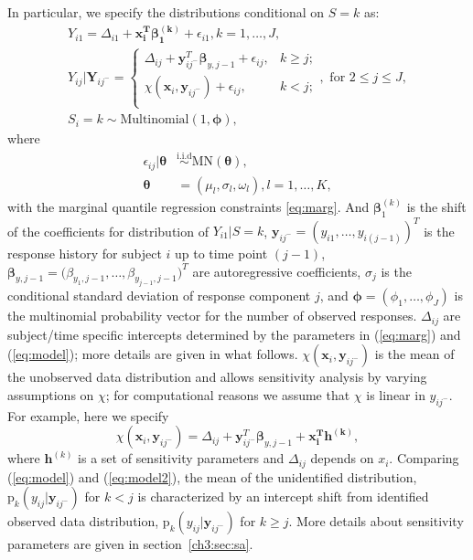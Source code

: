 \documentclass[useAMS,usenatbib,referee]{biom}
\newcommand{\iid}{\stackrel{\mbox{i.i.d}}{\sim}}
\newcommand{\pr}{\mbox{p}}
\begin{document}
In particular, we specify the distributions conditional on $S=k$ as:
\begin{equation}
  \begin{array}{l}
      \displaystyle Y_{i1} = \Delta_{i1} +  \bm{x_{i}^T\beta_1^{(k)}} + \epsilon_{i1} , k = 1, \ldots, J,\\
       \displaystyle        Y_{ij}|\bm Y_{ij^{-}} =
      \begin{cases}
        \Delta_{ij} + \bm y_{ij^{-}}^T \bm \beta_{y,j-1} + \epsilon_{ij}, & k \geq j ;  \\
        \chi(\bm x_{i}, \bm y_{ij^{-}}) + \epsilon_{ij}, & k < j ;  \\
      \end{cases}, \mbox{ for } 2 \leq j \leq J,  \\
       S_{i} = k \sim \textrm{Multinomial}(1, \bm \phi),
    \end{array}
  \label{eq:model}
\end{equation}
where
\begin{equation}
\begin{aligned}
\epsilon_{ij} |\bm \theta & \iid \mbox{MN}(\bm \theta),  \\
\bm \theta & = (\mu_l, \sigma_l, \omega_l), l = 1, \ldots, K,
\end{aligned}\label{eq:mixprob}
\end{equation}
with the marginal quantile regression constraints \eqref{eq:marg}.
And $\bm \beta_1^{(k)}$ is the shift of the coefficients for distribution of $Y_{i1} | S = k$,
$\bm y_{ij^{-}} = (y_{i1}, \ldots, y_{i(j-1)})^T$ is the response history for subject $i$ up to time point  $(j-1)$,
$\bm \beta_{y, j-1} = \big(\beta_{y_1, j-1}, \ldots, \beta_{y_{j-1}, j-1} \big)^T$ are autoregressive coefficients,
$\sigma_j$ is the conditional standard deviation of response component $j$, and
$\bm \phi = (\phi_1, \ldots, \phi_J)$ is the multinomial probability vector for the number of observed responses.
$\Delta_{ij}$ are subject/time specific intercepts determined by the parameters in (\ref{eq:marg}) and (\ref{eq:model}); more details are given in what follows.
$\chi(\bm x_{i}, \bm y_{ij^{-}})$ is the mean of the unobserved data distribution and allows sensitivity analysis by varying assumptions on $\chi$; for computational reasons we assume that $\chi$ is linear in $y_{ij^{-}}$.
For example, here we specify
\begin{equation}
\label{eq:model2}
\chi(\bm x_{i}, \bm y_{ij^{-}}) = \Delta_{ij}  + \bm y_{ij^{-}}^T \bm \beta_{y,j-1} + \bm{x_{i}^{T} h^{(k)}} ,
\end{equation}
where $\bm h^{(k)}$ is a set of sensitivity parameters and $\Delta_{ij}$ depends on $x_i$.
Comparing (\ref{eq:model}) and (\ref{eq:model2}), the mean of the unidentified distribution,
$\pr_k(y_{ij}|\bm y_{ij^{-}})$ for $k < j$ is characterized by an intercept shift from identified observed data distribution, $\pr_k(y_{ij}|\bm y_{ij^{-}})$ for $k \geq j$.
More details about sensitivity parameters are given in section~\ref{ch3:sec:sa}.
\end{document}
